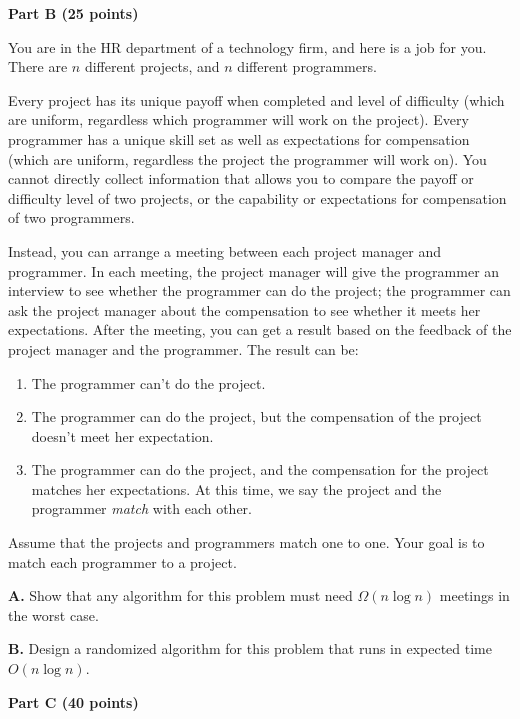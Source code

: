 \documentclass{article}
\begin{document}
\begin{center}
{\bf Part B (25 points)}
\end{center}

 You are in the HR department of a
technology firm, and here is a job for you.  There are $n$ different
projects, and $n$ different programmers.

Every project has its unique payoff when completed and level of
difficulty (which are uniform, regardless which programmer will work
on the project).  Every programmer has a unique skill set as well as
expectations for compensation (which are uniform, regardless the
project the programmer will work on). You cannot directly collect
information that allows you to compare the payoff or difficulty level
of two projects, or the capability or expectations for compensation of
two programmers.

Instead, you can arrange a meeting between each project manager and
programmer.  In each meeting, the project manager will give the
programmer an interview to see whether the programmer can do the
project; the programmer can ask the project manager about the
compensation to see whether it meets her expectations.  After the
meeting, you can get a result based on the feedback of the project
manager and the programmer.  The result can be:

\begin{enumerate}
  \item The programmer can't do the project.
  \item The programmer can do the project, but the compensation of the
    project doesn't meet her expectation.
  \item The programmer can do the project, and the compensation for
    the project matches her expectations. At this time, we say the
    project and the programmer \textit{match} with each other.
\end{enumerate}

Assume that the projects and programmers match one to one. Your goal
is to match each programmer to a project.

{\bf A.} Show that any algorithm for this problem must need $\Omega( n
\log{n} )$ meetings in the worst case.

{\bf B.}  Design a randomized algorithm for this problem that runs in
expected time $O ( n \log{n} )$.

\newpage

\begin{center}
{\bf Part C (40 points)}
\end{center}
\end{document}
